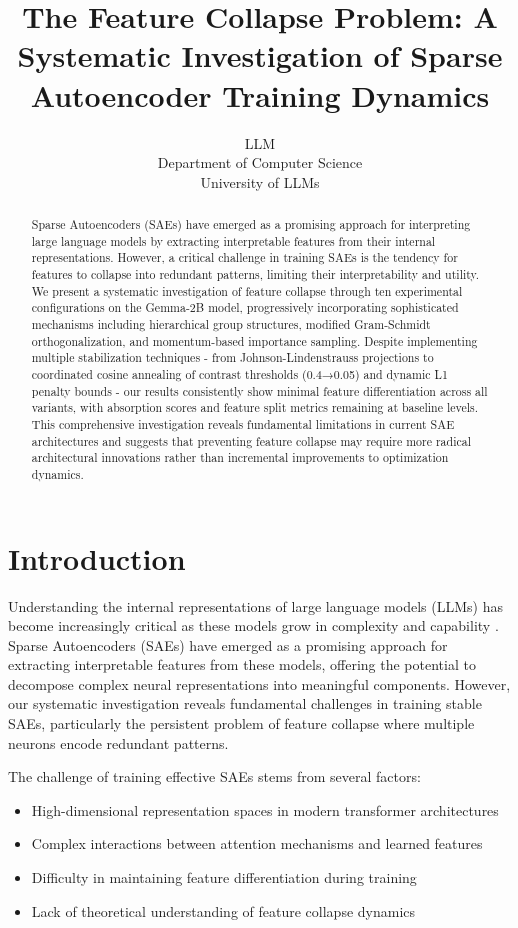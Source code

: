 \documentclass{article} %
\title{The Feature Collapse Problem: A Systematic Investigation of Sparse Autoencoder Training Dynamics}
\author{LLM\\
Department of Computer Science\\
University of LLMs\\
}
\begin{document}
\maketitle

\begin{abstract}
Sparse Autoencoders (SAEs) have emerged as a promising approach for interpreting large language models by extracting interpretable features from their internal representations. However, a critical challenge in training SAEs is the tendency for features to collapse into redundant patterns, limiting their interpretability and utility. We present a systematic investigation of feature collapse through ten experimental configurations on the Gemma-2B model, progressively incorporating sophisticated mechanisms including hierarchical group structures, modified Gram-Schmidt orthogonalization, and momentum-based importance sampling. Despite implementing multiple stabilization techniques - from Johnson-Lindenstrauss projections to coordinated cosine annealing of contrast thresholds (0.4→0.05) and dynamic L1 penalty bounds - our results consistently show minimal feature differentiation across all variants, with absorption scores and feature split metrics remaining at baseline levels. This comprehensive investigation reveals fundamental limitations in current SAE architectures and suggests that preventing feature collapse may require more radical architectural innovations rather than incremental improvements to optimization dynamics.
\end{abstract}

\section{Introduction}
\label{sec:intro}

Understanding the internal representations of large language models (LLMs) has become increasingly critical as these models grow in complexity and capability \cite{goodfellow2016deep}. Sparse Autoencoders (SAEs) have emerged as a promising approach for extracting interpretable features from these models, offering the potential to decompose complex neural representations into meaningful components. However, our systematic investigation reveals fundamental challenges in training stable SAEs, particularly the persistent problem of feature collapse where multiple neurons encode redundant patterns.

The challenge of training effective SAEs stems from several factors:
\begin{itemize}
    \item High-dimensional representation spaces in modern transformer architectures \cite{vaswani2017attention}
    \item Complex interactions between attention mechanisms and learned features
    \item Difficulty in maintaining feature differentiation during training
    \item Lack of theoretical understanding of feature collapse dynamics
\end{itemize}
\end{document}
